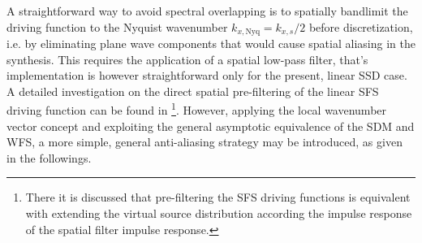 A straightforward way to avoid spectral overlapping is to spatially bandlimit the driving function to the Nyquist wavenumber $k_{x,\mathrm{Nyq}} = k_{x,s}/2$ before discretization, i.e. by eliminating plane wave components that would cause spatial aliasing in the synthesis.
This requires the application of a spatial low-pass filter, that's implementation is however straightforward only for the present, linear SSD case.
A detailed investigation on the direct spatial pre-filtering of the linear SFS driving function can be found in \cite{Firtha2012:isma, Ahrens2012} \footnote{There it is discussed that pre-filtering the SFS driving functions is equivalent with extending the virtual source distribution according the impulse response of the spatial filter impulse response.}.
However, applying the local wavenumber vector concept and exploiting the general asymptotic equivalence of the SDM and WFS, a more simple, general anti-aliasing strategy may be introduced, as given in the followings.

